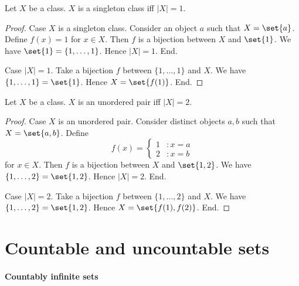 \documentclass[../arithmetic.tex]{subfiles}
\begin{document}
  \begin{forthel}
    \begin{proposition}
      Let $X$ be a class.
      $X$ is a singleton class iff $|X| = 1$.
    \end{proposition}
    \begin{proof}
      Case $X$ is a singleton class.
        Consider an object $a$ such that $X = \set{a}$.
        Define $f(x) = 1$ for $x \in X$.
        Then $f$ is a bijection between $X$ and $\set{1}$.
        We have $\set{1} = \{ 1, \dots, 1 \}$.
        Hence $|X| = 1$.
      End.

      Case $|X| = 1$.
        Take a bijection $f$ between $\{ 1, \dots, 1 \}$ and $X$.
        We have $\{ 1, \dots, 1 \} = \set{1}$.
        Hence $X = \set{f(1)}$.
      End.
    \end{proof}
  \end{forthel}

  \begin{forthel}
    \begin{proposition}
      Let $X$ be a class.
      $X$ is an unordered pair iff $|X| = 2$.
    \end{proposition}
    \begin{proof}
      Case $X$ is an unordered pair.
        Consider distinct objects $a, b$ such that $X = \set{a, b}$.
        Define
        \[ f(x) =
          \begin{cases}
            1 & : x = a
            \\
            2 & : x = b
          \end{cases} \]
        for $x \in X$.
        Then $f$ is a bijection between $X$ and $\set{1, 2}$.
        We have $\{ 1, \dots, 2 \} = \set{1, 2}$.
        Hence $|X| = 2$.
      End.

      Case $|X| = 2$.
        Take a bijection $f$ between $\{ 1, \dots, 2 \}$ and $X$.
        We have $\{ 1, \dots, 2 \} = \set{1, 2}$.
        Hence $X = \set{f(1), f(2)}$.
      End.
    \end{proof}
  \end{forthel}


  \section{Countable and uncountable sets}

  \paragraph{Countably infinite sets}
\end{document}
